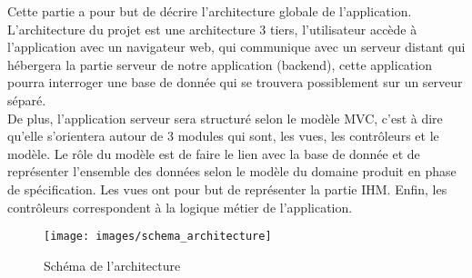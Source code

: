 Cette partie a pour but de décrire l'architecture globale de l'application.\\

L'architecture du projet est une architecture 3 tiers, l'utilisateur accède à l'application avec un navigateur web, qui communique avec un serveur distant qui hébergera la partie serveur de notre application (backend), cette application pourra interroger une base de donnée qui se trouvera possiblement sur un serveur séparé.\\

De plus, l'application serveur sera structuré selon le modèle MVC, c'est à dire qu'elle s'orientera autour de 3 modules qui sont, les vues, les contrôleurs et le modèle. Le rôle du modèle est de faire le lien avec la base de donnée et de représenter l'ensemble des données selon le modèle du domaine produit en phase de spécification. Les vues ont pour but de représenter la partie IHM. Enfin, les contrôleurs correspondent à la logique métier de l'application. 


\begin{figure}[!h]
	\begin{center}
	\texttt{[image: images/schema\_architecture]}
	\caption{\label{archi_schema} Schéma de l'architecture}
	\end{center}
\end{figure}
